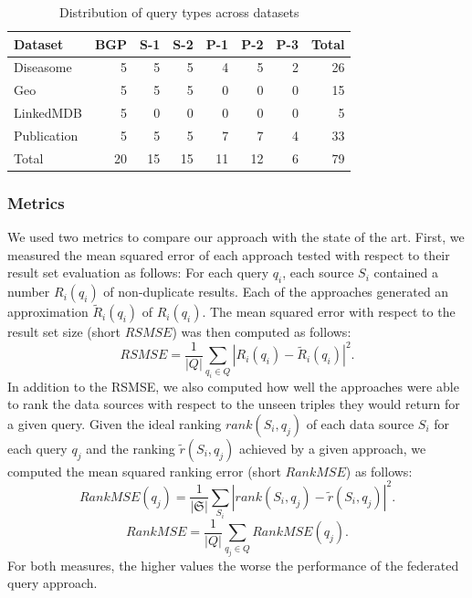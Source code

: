 \documentclass{sig-alternate}  %
\begin{document}
\begin{table}
\centering
\begin{tabular}{lrrrrrrr}
\hline
Dataset 		& BGP  & S-1 & S-2 & P-1 & P-2 & P-3 & Total \\\hline
Diseasome 			& 5 & 5 & 5 & 4 & 5 & 2 & 26 \\
Geo  & 5 & 5 & 5 & 0 & 0 & 0 & 15 \\
LinkedMDB 			& 5 & 0 & 0 & 0 & 0 & 0 & 5 \\
Publication 		& 5 & 5 & 5 & 7 & 7 & 4 & 33 \\\hline
Total 					& 20 & 15 & 15 & 11 & 12 & 6 & 79\\
\hline
\end{tabular}
\caption{Distribution of query types across datasets}
\label{tab:queries}
\end{table}

\subsubsection{Metrics}
We used two metrics to compare our approach with the state of the art.
First, we measured the mean squared error of each approach tested with respect to their result set evaluation as follows:
For each query $q_i$, each source $S_i$ contained a number $R_i(q_i)$ of non-duplicate results.
Each of the approaches generated an approximation $\tilde{R}_i(q_i)$ of $R_i(q_i)$.
The mean squared error with respect to the result set size (short $RSMSE$) was then computed as follows:
\begin{equation}
RSMSE = \frac{1}{|Q|}\sum\limits_{q_i \in Q}|R_i(q_i) - \tilde{R}_i(q_i)|^2.
\end{equation}
In addition to the RSMSE, we also computed how well the approaches were able to rank the data sources with respect to the unseen triples they would return for a given query.
Given the ideal ranking $rank(S_i, q_j)$ of each data source $S_i$ for each query $q_j$ and the ranking $\tilde{r}(S_i, q_j)$ achieved by a given approach, we computed the mean squared ranking error (short $RankMSE$) as follows:
\begin{equation}
RankMSE (q_j) = \frac{1}{|\mathfrak{S}|}\sum\limits_{S_i}|rank(S_i, q_j) - \tilde{r}(S_i, q_j)|^2.
\end{equation}
\begin{equation}
RankMSE  = \frac{1}{|Q|}\sum\limits_{q_j  \in Q}RankMSE(q_j).
\end{equation}
For both measures, the higher values the worse the performance of the federated query approach.
\end{document}
